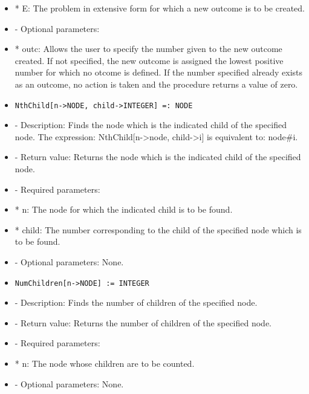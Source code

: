 \begin{itemize}
\bd
\item
*  E:  The problem in extensive form for which a new outcome is to
be created.
\ed

\item
- Optional parameters:

\bd
\item
*  outc:  Allows the user to specify the number given to the new 
outcome created.  If not specified, the new outcome is assigned the 
lowest positive number for which no otcome is defined.  If the number
specified already exists as an outcome, no action is taken and the 
procedure returns a value of zero.
\ed
\ed

\item
\begin{verbatim}
NthChild[n->NODE, child->INTEGER] =: NODE
\end{verbatim}

\bd
\item
- Description:  Finds the node which is the indicated child of the 
specified node.  The expression:  NthChild[n->node, child->i] is 
equivalent to:  node\#i.
\item
- Return value:  Returns the node which is the indicated child of the
specified node.
\item- Required parameters:
	  
\bd
\item
*  n:  The node for which the indicated child is to be found.
\item
*  child:  The number corresponding to the child of the specified 
node which is to be found.
\ed

\item 
- Optional parameters:  None.
\ed

\item
\begin{verbatim}
NumChildren[n->NODE] := INTEGER
\end{verbatim}

\bd
\item
- Description:  Finds the number of children of the specified node.
\item
- Return value:  Returns the number of children of the specified node.
\item
- Required parameters:

\bd
\item
*  n:  The node whose children are to be counted.
\ed

\item
- Optional parameters:  None.
\ed


\end{itemize}
